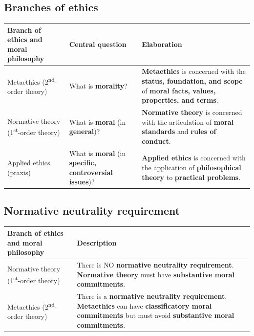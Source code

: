 \documentclass[11pt]{article}
\begin{document}
\subsection{Branches of ethics}
\label{sec:org1a33117}
\begin{center}
\begin{tabularx}{\textwidth}{|X|X|X|}
\hline
Branch of ethics and moral philosophy & Central question & Elaboration\\
\hline
Metaethics (2\textsuperscript{nd}-order theory) & What is \textbf{morality}? & \textbf{Metaethics} is concerned with the \textbf{status, foundation, and scope} of \textbf{moral facts, values, properties, and terms}.\\
\hline
Normative theory (1\textsuperscript{st}-order theory) & What is \textbf{moral} (in \textbf{general})? & \textbf{Normative theory} is concerned with the articulation of \textbf{moral standards} and \textbf{rules of conduct}.\\
\hline
Applied ethics (praxis) & What is \textbf{moral} (in \textbf{specific, controversial issues})? & \textbf{Applied ethics} is concerned with the application of \textbf{philosophical theory} to \textbf{practical problems}.\\
\hline
\end{tabularx}
\end{center}
\subsection{Normative neutrality requirement}
\label{sec:orgd47e4ff}
\begin{center}
\begin{tabularx}{\textwidth}{|X|X|}
\hline
Branch of ethics and moral philosophy & Description\\
\hline
Normative theory (1\textsuperscript{st}-order theory) & There is NO \textbf{normative neutrality requirement}. \textbf{Normative theory} must have \textbf{substantive moral commitments}.\\
\hline
Metaethics (2\textsuperscript{nd}-order theory) & There is a \textbf{normative neutrality requirement}. \textbf{Metaethics} can have \textbf{classificatory moral commitments} but must avoid \textbf{substantive moral commitments}.\\
\hline
\end{tabularx}
\end{center}
 \newpage
\end{document}
